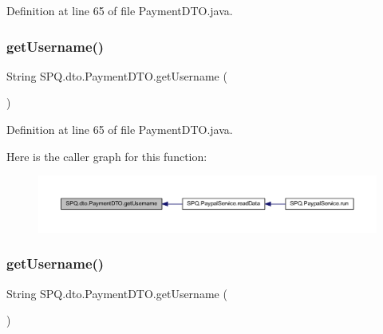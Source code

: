 Definition at line 65 of file Payment\+D\+T\+O.\+java.

\mbox{\label{class_s_p_q_1_1dto_1_1_payment_d_t_o_a31d0edbb3ec64b406e70cd3deaa5ab1a}} 
\subsubsection{\texorpdfstring{get\+Username()}{getUsername()}\hspace{0.1cm}{\footnotesize\ttfamily [2/3]}}
{\footnotesize\ttfamily String S\+P\+Q.\+dto.\+Payment\+D\+T\+O.\+get\+Username (\begin{DoxyParamCaption}{ }\end{DoxyParamCaption})}



Definition at line 65 of file Payment\+D\+T\+O.\+java.

Here is the caller graph for this function\+:
\nopagebreak
\begin{figure}[H]
\begin{center}
\leavevmode
\includegraphics[width=350pt]{class_s_p_q_1_1dto_1_1_payment_d_t_o_a31d0edbb3ec64b406e70cd3deaa5ab1a_icgraph}
\end{center}
\end{figure}
\mbox{\label{class_s_p_q_1_1dto_1_1_payment_d_t_o_a31d0edbb3ec64b406e70cd3deaa5ab1a}} 
\subsubsection{\texorpdfstring{get\+Username()}{getUsername()}\hspace{0.1cm}{\footnotesize\ttfamily [3/3]}}
{\footnotesize\ttfamily String S\+P\+Q.\+dto.\+Payment\+D\+T\+O.\+get\+Username (\begin{DoxyParamCaption}{ }\end{DoxyParamCaption})}




